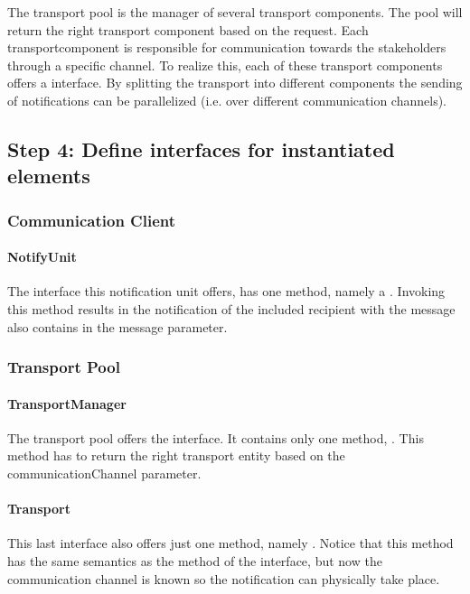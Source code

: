 \npar The transport pool is the manager of several transport components. The
pool will return the right transport component based on the request. Each
transportcomponent is responsible for communication towards the stakeholders
through a specific channel. To realize this, each of these transport components
offers a  interface. By splitting the transport into different
components the sending of notifications can be parallelized (i.e. over
different communication channels).

\subsection{Step 4: Define interfaces for instantiated elements}
\label{add:it8/interfaces}

\subsubsection{Communication Client}

\paragraph{NotifyUnit}

\npar The interface this notification unit offers, has one method, namely a
. Invoking this method results in the notification of the
included recipient with the message also contains in the message parameter.

\subsubsection{Transport Pool}

\paragraph{TransportManager}

\npar The transport pool offers the  interface. It
contains only one method, . This
method has to return the right transport entity based on the
communicationChannel parameter.

\paragraph{Transport}

\npar This last interface also offers just one method, namely
. Notice that this method has the same semantics as
the method of the  interface, but now the communication
channel is known so the notification can physically take place.

